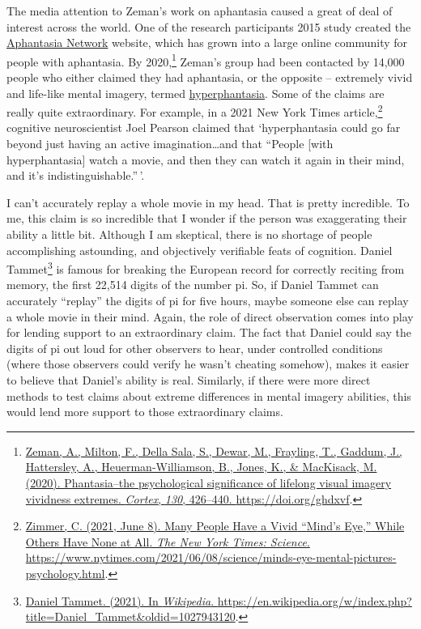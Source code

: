 \documentclass[
  oneside,
  12pt]{crumpbook}
\begin{document}
The media attention to Zeman's work on aphantasia caused a great of deal of interest across the world. One of the research participants 2015 study created the \href{https://aphantasia.com}{Aphantasia Network} website, which has grown into a large online community for people with aphantasia. By 2020,\footnote{\protect\hyperlink{ref-zemanPhantasiaPsychologicalSignificance2020}{Zeman, A., Milton, F., Della Sala, S., Dewar, M., Frayling, T., Gaddum, J., Hattersley, A., Heuerman-Williamson, B., Jones, K., \& MacKisack, M. (2020). Phantasia--the psychological significance of lifelong visual imagery vividness extremes. \emph{Cortex}, \emph{130}, 426--440. \url{https://doi.org/ghdxvf}}.} Zeman's group had been contacted by 14,000 people who either claimed they had aphantasia, or the opposite -- extremely vivid and life-like mental imagery, termed \protect\hyperlink{gls-hyperphantasia}{hyperphantasia}. Some of the claims are really quite extraordinary. For example, in a 2021 New York Times article,\footnote{\protect\hyperlink{ref-zimmerManyPeopleHave2021}{Zimmer, C. (2021, June 8). Many {People Have} a {Vivid} {``{Mind}'s {Eye},''} {While Others Have None} at {All}. \emph{The New York Times: Science}. \url{https://www.nytimes.com/2021/06/08/science/minds-eye-mental-pictures-psychology.html}}.} cognitive neuroscientist Joel Pearson claimed that `hyperphantasia could go far beyond just having an active imagination\ldots and that ``People {[}with hyperphantasia{]} watch a movie, and then they can watch it again in their mind, and it's indistinguishable.''\,'.

I can't accurately replay a whole movie in my head. That is pretty incredible. To me, this claim is so incredible that I wonder if the person was exaggerating their ability a little bit. Although I am skeptical, there is no shortage of people accomplishing astounding, and objectively verifiable feats of cognition. Daniel Tammet\footnote{\protect\hyperlink{ref-DanielTammet2021}{Daniel {Tammet}. (2021). In \emph{Wikipedia}. \url{https://en.wikipedia.org/w/index.php?title=Daniel_Tammet\&oldid=1027943120}}.} is famous for breaking the European record for correctly reciting from memory, the first 22,514 digits of the number pi. So, if Daniel Tammet can accurately ``replay'' the digits of pi for five hours, maybe someone else can replay a whole movie in their mind. Again, the role of direct observation comes into play for lending support to an extraordinary claim. The fact that Daniel could say the digits of pi out loud for other observers to hear, under controlled conditions (where those observers could verify he wasn't cheating somehow), makes it easier to believe that Daniel's ability is real. Similarly, if there were more direct methods to test claims about extreme differences in mental imagery abilities, this would lend more support to those extraordinary claims.
\end{document}
